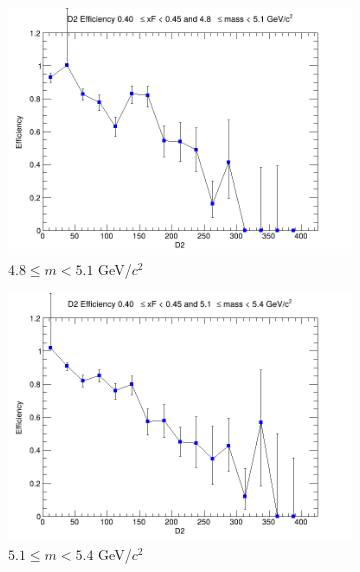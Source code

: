 \begin{figure}[p]
\begin{subfigure}[b]{0.32\textwidth}
        \centering
        \includegraphics[width=\textwidth]{./kTrackerEfficiencyPlots/D2_Efficiency_xF8_mass2.png}
        \caption{$4.8 \leq m < 5.1$ GeV/$c^2$}
        \label{fig:xF8_mass2}
    \end{subfigure}
    \vspace{0.5cm}
    \begin{subfigure}[b]{0.32\textwidth}
        \centering
        \includegraphics[width=\textwidth]{./kTrackerEfficiencyPlots/D2_Efficiency_xF8_mass3.png}
        \caption{$5.1 \leq m < 5.4$ GeV/$c^2$}
        \label{fig:xF8_mass3}
    \end{subfigure}
    \hfill
    \begin{subfigure}[b]{0.32\textwidth}
        \centering

\end{subfigure}
\end{figure}
